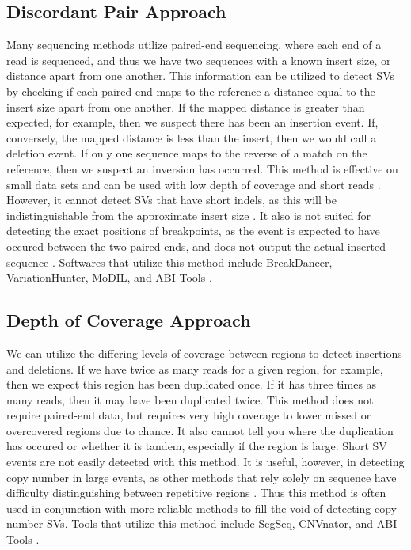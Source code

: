 \documentclass{easychithesis}
\begin{document}
\subsection{Discordant Pair Approach}
Many sequencing methods utilize paired-end sequencing, where each end of a read is sequenced, and thus we have two sequences with a known insert size, or distance apart from one another. This information can be utilized to detect SVs by checking if each paired end maps to the reference a distance equal to the insert size apart from one another. If the mapped distance is greater than expected, for example, then we suspect there has been an insertion event. If, conversely, the mapped distance is less than the insert, then we would call a deletion event. If only one sequence maps to the reverse of a match on the reference, then we suspect an inversion has occurred. This method is effective on small data sets and can be used with low depth of coverage and short reads \cite{suzuki2011clipcrop}. However, it cannot detect SVs that have short indels, as this will be indistinguishable from the approximate insert size \cite{abel2013detection, pabinger2014survey}. It also is not suited for detecting the exact positions of breakpoints, as the event is expected to have occured between the two paired ends, and does not output the actual inserted sequence \cite{abel2013detection}. Softwares that utilize this method include BreakDancer, VariationHunter, MoDIL, and ABI Tools \cite{suzuki2011clipcrop}.

\subsection{Depth of Coverage Approach}
We can utilize the differing levels of coverage between regions to detect insertions and deletions. If we have twice as many reads for a given region, for example, then we expect this region has been duplicated once. If it has three times as many reads, then it may have been duplicated twice. This method does not require paired-end data, but requires very high coverage to lower missed or overcovered regions due to chance. It also cannot tell you where the duplication has occured or whether it is tandem, especially if the region is large\cite{suzuki2011clipcrop}. Short SV events are not easily detected with this method. It is useful, however, in detecting copy number in large events, as other methods that rely solely on sequence have difficulty distinguishing between repetitive regions \cite{suzuki2011clipcrop}. Thus this method is often used in conjunction with more reliable methods to fill the void of detecting copy number SVs. Tools that utilize this method include SegSeq, CNVnator, and ABI Tools \cite{suzuki2011clipcrop}.
\end{document}
